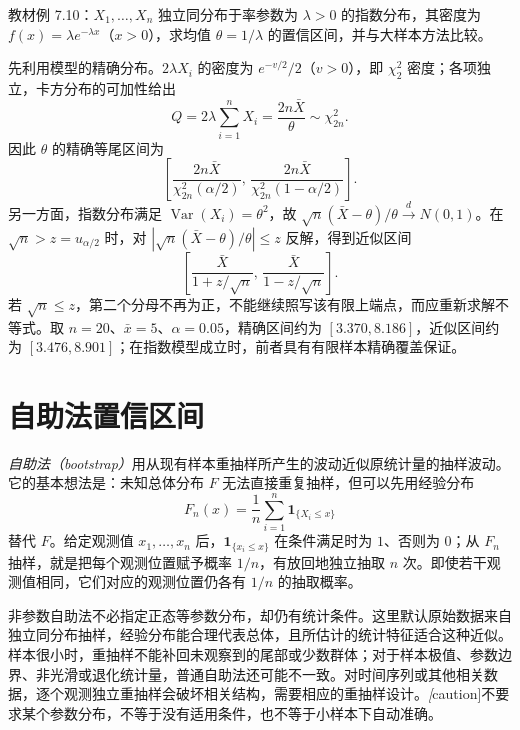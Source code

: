 \begin{example}
\label{ex:study-exponential-mean-interval}
教材例 7.10：$X_1,\ldots,X_n$ 独立同分布于率参数为 $\lambda>0$ 的指数分布，其密度为 $f(x)=\lambda e^{-\lambda x}$（$x>0$），求均值 $\theta=1/\lambda$ 的置信区间，并与大样本方法比较。
\end{example}
\begin{solve}
先利用模型的精确分布。$2\lambda X_i$ 的密度为 $e^{-v/2}/2$（$v>0$），即 $\chi_2^2$ 密度；各项独立，卡方分布的可加性给出
\[
  Q=2\lambda\sum_{i=1}^nX_i
   =\frac{2n\bar X}\theta\sim\chi_{2n}^2.
\]
因此 $\theta$ 的精确等尾区间为
\begin{equation}
  \left[
    \frac{2n\bar X}{\chi_{2n}^2(\alpha/2)},\,
    \frac{2n\bar X}{\chi_{2n}^2(1-\alpha/2)}
  \right].
  \label{eq:study-exponential-mean-exact-ci}
\end{equation}
另一方面，指数分布满足 $\operatorname{Var}(X_i)=\theta^2$，故 $\sqrt n(\bar X-\theta)/\theta\xrightarrow{d}N(0,1)$。在 $\sqrt n>z=u_{\alpha/2}$ 时，对 $|\sqrt n(\bar X-\theta)/\theta|\le z$ 反解，得到近似区间
\begin{equation}
  \left[\frac{\bar X}{1+z/\sqrt n},\,
        \frac{\bar X}{1-z/\sqrt n}\right].
  \label{eq:study-exponential-mean-asymptotic-ci}
\end{equation}
若 $\sqrt n\le z$，第二个分母不再为正，不能继续照写该有限上端点，而应重新求解不等式。取 $n=20$、$\bar x=5$、$\alpha=0.05$，精确区间约为 $[3.370,8.186]$，近似区间约为 $[3.476,8.901]$；在指数模型成立时，前者具有有限样本精确覆盖保证。
\end{solve}

\section{自助法置信区间}
\label{sec:study-bootstrap-intervals}

\emph{自助法（bootstrap）}用从现有样本重抽样所产生的波动近似原统计量的抽样波动。它的基本想法是：未知总体分布 $F$ 无法直接重复抽样，但可以先用经验分布
\[
  F_n(x)=\frac1n\sum_{i=1}^n\mathbf1_{\{X_i\le x\}}
\]
替代 $F$。给定观测值 $x_1,\ldots,x_n$ 后，$\mathbf1_{\{x_i\le x\}}$ 在条件满足时为 $1$、否则为 $0$；从 $F_n$ 抽样，就是把每个观测位置赋予概率 $1/n$，有放回地独立抽取 $n$ 次。即使若干观测值相同，它们对应的观测位置仍各有 $1/n$ 的抽取概率。

非参数自助法不必指定正态等参数分布，却仍有统计条件。这里默认原始数据来自独立同分布抽样，经验分布能合理代表总体，且所估计的统计特征适合这种近似。样本很小时，重抽样不能补回未观察到的尾部或少数群体；对于样本极值、参数边界、非光滑或退化统计量，普通自助法还可能不一致。对时间序列或其他相关数据，逐个观测独立重抽样会破坏相关结构，需要相应的重抽样设计。\emph[caution]{不要求某个参数分布，不等于没有适用条件，也不等于小样本下自动准确。}

